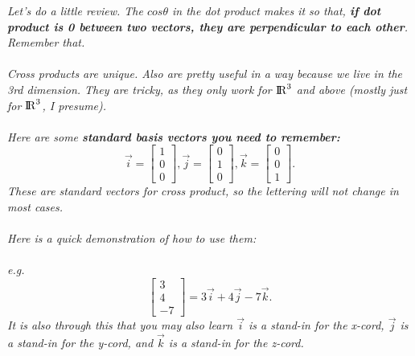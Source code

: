 \documentclass[addpoints]{exam}
\begin{document}
\textit{
Let's do a little review. The $cos\theta$ in the dot product makes it so that, \textbf{if dot product is 0 between two vectors, they are perpendicular to each other}. Remember that.
}\\\\
\textit{
Cross products are unique. Also are pretty useful in a way because we live in the 3rd dimension. They are tricky, as they only work for ${\rm I\!R}^3$ and above (mostly just for ${\rm I\!R}^3$, I presume). 
}\\\\
\textit{
Here are some \textbf{standard basis vectors you need to remember:}
\[
\vec{i}=\begin{bmatrix}
    1\\
    0\\
    0
\end{bmatrix},
\vec{j}=\begin{bmatrix}
    0\\
    1\\
    0
\end{bmatrix},
\vec{k}=\begin{bmatrix}
    0\\
    0\\
    1
\end{bmatrix}.
\]
These are standard vectors for cross product, so the lettering will not change in most cases.
}\\\\
\textit{
Here is a quick demonstration of how to use them:\\\\
e.g.
\[
\begin{bmatrix}
    3\\4\\-7
\end{bmatrix}
= 3\vec{i}+4\vec{j}-7\vec{k}.
\]
It is also through this that you may also learn $\vec{i}$ is a stand-in for the x-cord, $\vec{j}$ is a stand-in for the y-cord, and $\vec{k}$ is a stand-in for the z-cord.
}\\\\
\end{document}
